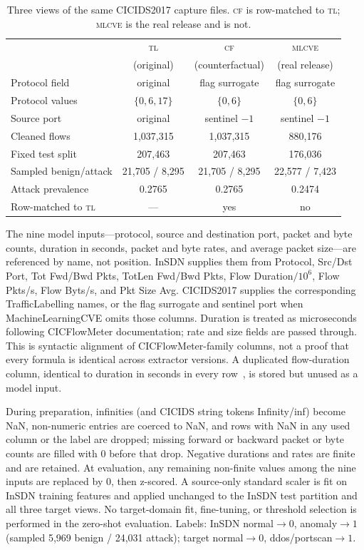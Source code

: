 \documentclass[conference,a4paper]{IEEEtran}
\begin{document}
\begin{table}[t]\caption{Three views of the same CICIDS2017 capture files. \textsc{cf} is row-matched to \textsc{tl}; \textsc{mlcve} is the real release and is not.}\label{tab:mirrors}\centering\scriptsize\setlength{\tabcolsep}{3pt}
\begin{tabular}{lccc}\toprule
& \textsc{tl} & \textsc{cf} & \textsc{mlcve}\\
& (original) & (counterfactual) & (real release)\\\midrule
Protocol field & original & flag surrogate & flag surrogate\\
Protocol values & $\{0,6,17\}$ & $\{0,6\}$ & $\{0,6\}$\\
Source port & original & sentinel $-1$ & sentinel $-1$\\
Cleaned flows & 1,037,315 & 1,037,315 & 880,176\\
Fixed test split & 207,463 & 207,463 & 176,036\\
Sampled benign/attack & 21,705 / 8,295 & 21,705 / 8,295 & 22,577 / 7,423\\
Attack prevalence & 0.2765 & 0.2765 & 0.2474\\
Row-matched to \textsc{tl} & --- & yes & no\\\bottomrule
\end{tabular}\end{table}

The nine model inputs---protocol, source and destination port, packet and byte counts, duration in seconds, packet and byte rates, and average packet size---are referenced by name, not position. InSDN supplies them from Protocol, Src/Dst Port, Tot Fwd/Bwd Pkts, TotLen Fwd/Bwd Pkts, Flow Duration$/10^{6}$, Flow Pkts/s, Flow Byts/s, and Pkt Size Avg. CICIDS2017 supplies the corresponding TrafficLabelling names, or the flag surrogate and sentinel port when MachineLearningCVE omits those columns. Duration is treated as microseconds following CICFlowMeter documentation; rate and size fields are passed through. This is syntactic alignment of CICFlowMeter-family columns, not a proof that every formula is identical across extractor versions. A duplicated flow-duration column, identical to duration in seconds in every row~\cite{rosay}, is stored but unused as a model input.

During preparation, infinities (and CICIDS string tokens Infinity/inf) become NaN, non-numeric entries are coerced to NaN, and rows with NaN in any used column or the label are dropped; missing forward or backward packet or byte counts are filled with 0 before that drop. Negative durations and rates are finite and are retained. At evaluation, any remaining non-finite values among the nine inputs are replaced by 0, then z-scored. A source-only standard scaler is fit on InSDN training features and applied unchanged to the InSDN test partition and all three target views. No target-domain fit, fine-tuning, or threshold selection is performed in the zero-shot evaluation. Labels: InSDN normal$\rightarrow0$, anomaly$\rightarrow1$ (sampled 5,969 benign / 24,031 attack); target normal$\rightarrow0$, ddos/portscan$\rightarrow1$.
\end{document}
